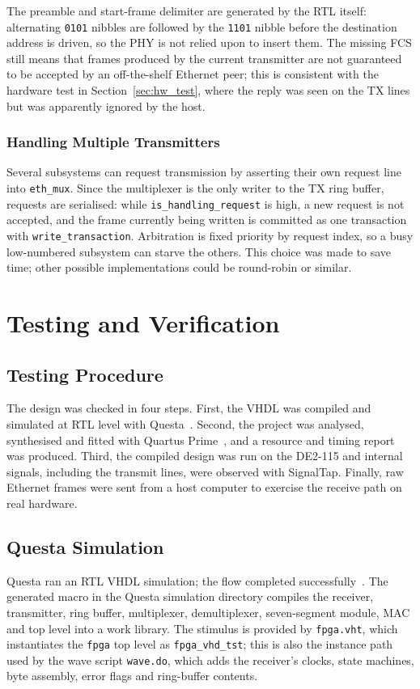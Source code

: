 \documentclass[11pt,a4paper]{article}
\begin{document}
The preamble and start-frame delimiter are generated by the RTL itself: alternating \texttt{0101} nibbles are followed by the \texttt{1101} nibble before the destination address is driven, so the PHY is not relied upon to insert them. The missing FCS still means that frames produced by the current transmitter are not guaranteed to be accepted by an off-the-shelf Ethernet peer; this is consistent with the hardware test in Section~\ref{sec:hw_test}, where the reply was seen on the TX lines but was apparently ignored by the host.

\subsubsection{Handling Multiple Transmitters}
Several subsystems can request transmission by asserting their own request line into \texttt{eth\_mux}. Since the multiplexer is the only writer to the TX ring buffer, requests are serialised: while \texttt{is\_handling\_request} is high, a new request is not accepted, and the frame currently being written is committed as one transaction with \texttt{write\_transaction}. Arbitration is fixed priority by request index, so a busy low-numbered subsystem can starve the others. This choice was made to save time; other possible implementations could be round-robin or similar.

\newpage

\section{Testing and Verification}
\subsection{Testing Procedure}
The design was checked in four steps. First, the VHDL was compiled and simulated at RTL level with Questa~\cite{questa}. Second, the project was analysed, synthesised and fitted with Quartus Prime~\cite{quartus}, and a resource and timing report was produced. Third, the compiled design was run on the DE2-115 and internal signals, including the transmit lines, were observed with SignalTap. Finally, raw Ethernet frames were sent from a host computer to exercise the receive path on real hardware.

\subsection{Questa Simulation}
Questa ran an RTL VHDL simulation; the flow completed successfully~\cite{questa}. The generated macro in the Questa simulation directory compiles the receiver, transmitter, ring buffer, multiplexer, demultiplexer, seven-segment module, MAC and top level into a work library. The stimulus is provided by \texttt{fpga.vht}, which instantiates the \texttt{fpga} top level as \texttt{fpga\_vhd\_tst}; this is also the instance path used by the wave script \texttt{wave.do}, which adds the receiver's clocks, state machines, byte assembly, error flags and ring-buffer contents.
\end{document}
